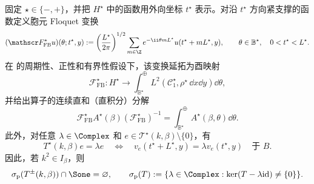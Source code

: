 \begin{lemma}
\label{lem:gap-unit-circle}
固定 $\star\in\{-,+\}$，并把 $H^\star$ 中的函数用外向坐标
$t^\star$ 表示。对沿 $t^\star$ 方向紧支撑的函数定义胞元 Floquet 变换
\[
  (\mathscr F_{\mathrm{FB}}^\star u)(\theta;t^\star,y)
  :=\left(\frac{L^\star}{2\pi}\right)^{1/2}
  \sum_{m\in\Z}e^{-\ii\theta mL^\star}
  u(t^\star+mL^\star,y),
  \qquad \theta\in\mathbb B^\star,
  \quad 0<t^\star<L^\star.
\]
在 的周期性、正性和有界性假设下，该变换延拓为酉映射
\[
  \mathscr F_{\mathrm{FB}}^\star:H^\star
  \longrightarrow
  \int_{\mathbb B^\star}^{\oplus}
  L^2(\mathcal C_1^\star,\rho^\star\,\dd x\dd y)\dd\theta,
\]
并给出算子的连续直和（直积分）分解
\[
  \mathscr F_{\mathrm{FB}}^\star A^\star(\beta)
  (\mathscr F_{\mathrm{FB}}^\star)^{-1}
  =\int_{\mathbb B^\star}^{\oplus}
  A^\star(\beta,\theta)\dd\theta.
\]
此外，对任意 $\lambda\in\Complex$ 和
$e\in\mathscr T^\star(k,\beta)\setminus\{0\}$，有
\[
  T^\star(k,\beta)e=\lambda e
  \quad\Longleftrightarrow\quad
  v_e(t^\star+L^\star,y)=\lambda v_e(t^\star,y)
  \quad\text{于 }B.
\]
因此，若 $k^2\in I_\beta$，则
\begin{equation}
  \sigma_{\mathrm p}(T^\pm(k,\beta))\cap\Sone=\varnothing,
  \qquad
  \sigma_{\mathrm p}(T):=
  \{\lambda\in\Complex:\ker(T-\lambda\mathrm{id})\neq\{0\}\}.
  \label{eq:no-unit-multiplier}
\end{equation}
\end{lemma}
